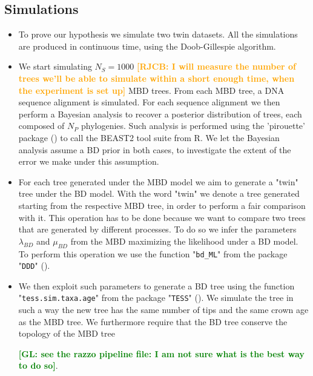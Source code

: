 \documentclass{article}
\newcommand*\richel[1]{\textcolor{orange}{\textbf{[RJCB: #1]}}}
\newcommand*\gio[1]{\textcolor{green}{\textbf{[GL: #1]}}}
\begin{document}
\subsection{Simulations}
\begin{itemize}

\item To prove our hypothesis we simulate two twin datasets. All the simulations are produced in continuous time, using the Doob-Gillespie algorithm. 

\item We start simulating $N_{S} = 1000$ \richel{I will measure the number of trees we'll be able to simulate within a short enough time, when the experiment is set up} MBD trees. From each MBD tree, a DNA sequence alignment is simulated. For each sequence alignment we then perform a Bayesian analysis to recover a posterior distribution of trees, each composed of $N_{P}$ phylogenies. Such analysis is performed using 
the 'pirouette' package (\cite{pirouette}) to call the BEAST2 tool 
suite from R. We let the Bayesian analysis assume a BD prior in both cases, to investigate
the extent of the error we make under this assumption.

\item For each tree 
generated under the MBD model we aim to generate a "twin" tree under the BD model. With the word "twin" we denote a tree generated starting from the respective MBD tree, in order to perform a fair comparison with it. This operation has to be done because we want to compare two trees that are generated by different processes. To do so we infer the parameters $\lambda_{BD}$ and $\mu_{BD}$ from the MBD maximizing the likelihood under a BD model. To perform this operation we use the function "\texttt{bd\_ML}" from the package "\texttt{DDD}" (\cite{etienne2012diversity}). 

\item We then exploit such parameters to generate a BD tree using the function "\texttt{tess.sim.taxa.age}" from the package "\texttt{TESS}" (\cite{Hoehna2013}). We simulate the tree in such a way the new tree has the same number of tips and the same crown age as the MBD tree. We furthermore require that the BD tree conserve the topology of the MBD tree 

\gio{see the razzo pipeline file: I am not sure what is the best way to do so}.



\end{itemize}
\end{document}
